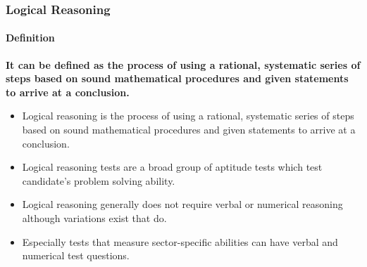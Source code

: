 \documentclass{beamer}
\begin{document}
\begin{frame}
    \frametitle{Logical Reasoning}
    \framesubtitle{Definition}
    {\bf It can be defined as the process of using a rational, systematic series of steps based on sound mathematical procedures and given statements to arrive at a conclusion.}
    
    \begin{itemize}
        \item Logical reasoning is the process of using a rational, systematic series of steps based on sound mathematical procedures and given statements to arrive at a conclusion.
        \item Logical reasoning tests are a broad group of aptitude tests which test candidate's problem solving ability.
        \item Logical reasoning generally does not require verbal or numerical reasoning although variations exist that do.
        \item Especially tests that measure sector-specific abilities can have verbal and numerical test questions.
    \end{itemize}

\end{frame}
\end{document}
